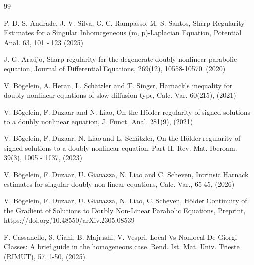 \documentclass[a4paper,11pt,fullpage]{article}
\numberwithin{equation}{section}
\begin{document}
\begin{thebibliography}{99}

P. D. S. Andrade, J. V. Silva, G. C. Rampasso, M. S. Santos, Sharp Regularity Estimates for a Singular Inhomogeneous (m, p)-Laplacian Equation, Potential Anal. 63, 101 - 123 (2025) 

{J. G. Ara\'ujo}, Sharp regularity for the degenerate doubly nonlinear parabolic equation, Journal of Differential Equations, 269(12), 10558-10570, (2020)

{V. B\"ogelein, A. Heran, L. Sch\"atzler and T. Singer,} Harnack's inequality for doubly nonlinear equations of slow diffusion type, Calc. Var. 60(215), (2021)


{V. B\"ogelein, F. Duzaar and N. Liao,} On the H\"older regularity of signed solutions to a doubly nonlinear equation, J. Funct. Anal.  281(9), (2021)

{V. B\"ogelein, F. Duzaar, N. Liao and L. Sch\"atzler},  On the H\"older regularity of signed solutions to a doubly nonlinear equation. Part II. Rev. Mat. Iberoam. 39(3), 1005 - 1037, (2023)

{V. B\"ogelein, F. Duzaar, U. Gianazza, N. Liao and C. Scheven}, Intrinsic Harnack estimates for singular doubly non-linear equations, Calc. Var., 65-45, (2026)

V. B\"{o}gelein, F. Duzaar, U. Gianazza, N. Liao, C. Scheven, H\"{o}lder Continuity of the Gradient of Solutions to Doubly Non-Linear Parabolic Equations, Preprint, https://doi.org/10.48550/arXiv.2305.08539



 F. Cassanello, S. Ciani, B. Majrashi, V. Vespri, Local Vs Nonlocal De Giorgi Classes: A brief guide in the homogeneous case. Rend. Ist. Mat. Univ. Trieste (RIMUT), 57, 1-50, (2025) 



\end{thebibliography}
\end{document}
